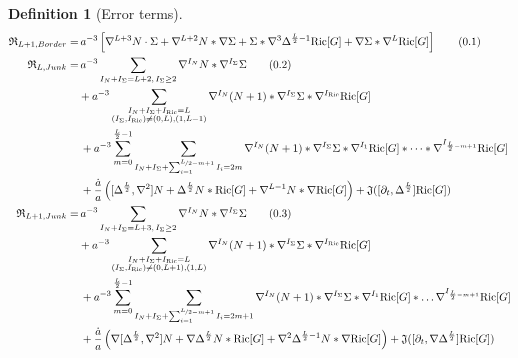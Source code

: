 \documentclass[11pt,leqno,textwidth=10cm]{amsart}
\numberwithin{equation}{section}
\theoremstyle{definition}
\newtheorem{definition}{Definition}[section]
\theoremstyle{plain}
\newcommand{\1}{\mathbbm{1}}
\newcommand{\Ric}{\text{\normalfont{Ric}}}
\newcommand{\del}{\partial}
\newcommand{\Lap}{\Delta}
\newcommand{\numberthis}{\addtocounter{equation}{1}\tag{\theequation}}
\renewcommand{\theequation}{\arabic{section}.\arabic{equation}}
\begin{document}
\begin{definition}[Error terms]
{\begin{subequations}
\begin{align*}
\mathfrak{R}_{L+1,Border}=&\,a^{-3}\left[\nabla^{L+3}N\cdot\Sigma+\nabla^{L+2}N\ast\nabla\Sigma+\Sigma\ast\nabla^3\Lap^{\frac{L}2-1}\Ric[G]+\nabla\Sigma\ast\nabla^L\Ric[G]\right] \numberthis\label{eq:comeq-Ric-odd-border}\\
\mathfrak{R}_{L,Junk}=&\,a^{-3}\sum_{I_N+I_\Sigma=L+2,\,I_\Sigma\geq 2}\nabla^{I_N}N\ast\nabla^{I_\Sigma}\Sigma \numberthis\label{eq:comeq-Ric-even-junk}\\
&+a^{-3}\sum_{\substack{I_N+I_\Sigma+I_\Ric=L\\ (I_\Sigma,I_\Ric)\neq (0,L),(1,L-1)}}\nabla^{I_N}(N+1)\ast\nabla^{I_\Sigma}\Sigma\ast\nabla^{I_\Ric}\Ric[G]\\
&\,+a^{-3}\sum_{m=0}^{\frac{L}2-1}\sum_{{I_N+I_\Sigma+\sum_{i=1}^{\nicefrac{L}2-m+1}I_i=2m}}\nabla^{I_N}(N+1)\ast\nabla^{I_\Sigma}\Sigma\ast\nabla^{I_1}\Ric[G]\ast\dots\ast\nabla^{I_{\frac{L}2-m+1}}\Ric[G]\\
&\,+\frac{\dot{a}}a\left([\Lap^\frac{L}2,\nabla^2]N+\Lap^\frac{L}2N\ast\Ric[G]+\nabla^{L-1}N\ast\nabla\Ric[G]\right)+\mathfrak{J}([\del_t,\Lap^{\frac{L}2}]\Ric[G])\\
\mathfrak{R}_{L+1,Junk}=&\,a^{-3}\sum_{I_N+I_\Sigma=L+3,\,I_\Sigma\geq 2}\nabla^{I_N}N\ast\nabla^{I_\Sigma}\Sigma \numberthis\label{eq:comeq-Ric-odd-junk}\\
&+a^{-3}\sum_{\substack{I_N+I_\Sigma+I_\Ric=L\\ (I_\Sigma,I_\Ric)\neq (0,L+1),(1,L)}}\nabla^{I_N}(N+1)\ast\nabla^{I_\Sigma}\Sigma\ast\nabla^{I_\Ric}\Ric[G]\\
&\,+a^{-3}\sum_{m=0}^{\frac{L}2-1}\sum_{{I_N+I_\Sigma+\sum_{i=1}^{\nicefrac{L}2-m+1}I_i=2m+1}}\nabla^{I_N}(N+1)\ast\nabla^{I_\Sigma}\Sigma\ast\nabla^{I_1}\Ric[G]\ast\dots\nabla^{I_{\frac{L}2-m+1}}\Ric[G]\\
&\,+\frac{\dot{a}}a\left(\nabla[\Lap^\frac{L}2,\nabla^2]N+\nabla\Lap^{\frac{L}2}N\ast\Ric[G]+\nabla^2\Lap^{\frac{L}2-1}N\ast\nabla\Ric[G]\right)+\mathfrak{J}([\del_t,\nabla\Lap^\frac{L}2]\Ric[G])\\
\end{align*}
\end{subequations}}


\end{definition}
\end{document}
